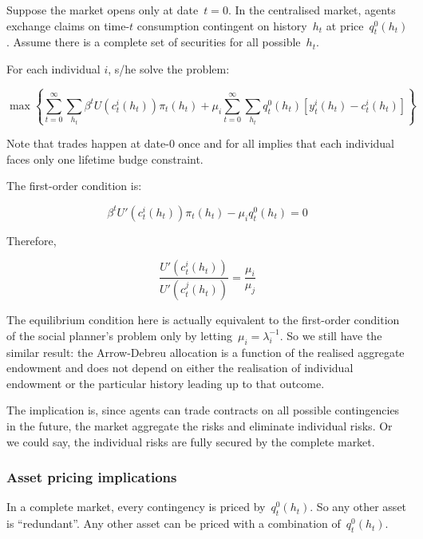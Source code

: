 \documentclass[10pt,a4]{article}
\begin{document}
{\label{267939}}

Suppose the market opens only at date~\(t=0\). In the
centralised market, agents exchange claims on time-\(t\)
consumption contingent on history~\(h_t\) at
price~\(q_t^0(h_t)\). Assume there is a complete set of securities
for all possible~\(h_t\).

\par\null

For each individual $i$, s/he solve the problem:

$$ \max\left\{ \sum_{t=0}^{\infty}\sum_{h_t}\beta^tU(c_t^i(h_t))\pi_t(h_t) + \mu_i\sum_{t=0}^{\infty}\sum_{h_t}q_t^0(h_t)[y_t^i(h_t)-c_t^i(h_t)]\right\} $$

Note that trades happen at date-\(0\) once and for all
implies that each individual faces only one lifetime budge constraint.

\par\null

The first-order condition is:

$$ \beta^t U'(c_t^i(h_t))\pi_t(h_t) - \mu_i q_t^0(h_t) = 0 $$

Therefore, 

$$ \frac{U'(c_t^i(h_t))}{U'(c_t^j(h_t))} =\frac{\mu_i}{\mu_j} $$

The equilibrium condition here is actually equivalent to the first-order
condition of the social planner's problem only by
letting~\(\mu_i = \lambda_i^{-1}\). So we still have the similar result: the
Arrow-Debreu allocation is a function of the realised aggregate
endowment and does not depend on either the realisation of individual
endowment or the particular history leading up to that outcome.

\par\null

The implication is, since agents can trade contracts on all possible
contingencies in the future, the market aggregate the risks and
eliminate individual risks. Or we could say, the individual risks are
fully secured by the complete market.~

\par\null

\subsubsection{Asset pricing
implications}

{\label{200528}}

In a complete market, every contingency is priced by~\(q_t^0(h_t)\).
So any other asset is ``redundant''. Any other asset can be priced with
a combination of~\(q_t^0(h_t)\).~
\end{document}
